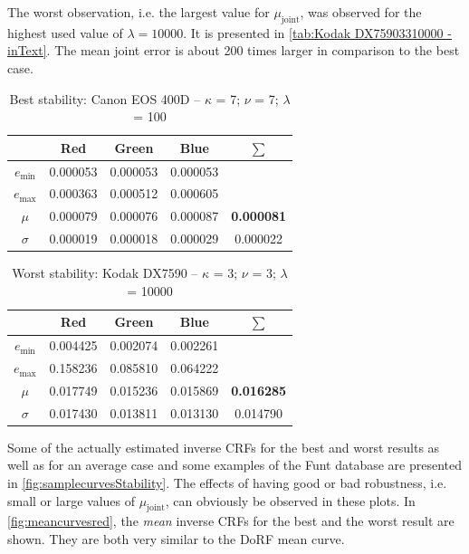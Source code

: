 The worst observation, \hbox{i.e.} the largest value for $\mu_\text{joint}$, was observed for the highest used value of $\lambda = 10000$. It is presented in \autoref{tab:Kodak DX75903310000 - inText}. The mean joint error is about 200 times larger in comparison to the best case.
\begin{table}[tb]
  \centering
    \begin{tabular}{|c||c|c|c|c|}\hline
		   & \textbf{Red} & \textbf{Green} & \textbf{Blue} & \textbf{$\sum$} \\\hline\hline
      $e_\text{min}$ & 0.000053 & 0.000053 & 0.000053 &   \\\hline
      $e_\text{max}$ & 0.000363 & 0.000512 & 0.000605 &   \\\hline
      $\mu$          & 0.000079 & 0.000076 & 0.000087 & \textbf{0.000081} \\\hline
      $\sigma$       & 0.000019 & 0.000018 & 0.000029 & 0.000022 \\\hline
    \end{tabular}
  \caption{Best stability: Canon EOS 400D -- $\kappa$ = 7; $\nu$ = 7; $\lambda$ = 100}
  \label{tab:Canon EOS 400D Rebel XTi77100 - inText}
\end{table}
\begin{table}
  \centering
    \begin{tabular}{|c||c|c|c|c|}\hline
		   & \textbf{Red} & \textbf{Green} & \textbf{Blue} & \textbf{$\sum$} \\\hline\hline
      $e_\text{min}$ & 0.004425 & 0.002074 & 0.002261 &   \\\hline
      $e_\text{max}$ & 0.158236 & 0.085810 & 0.064222 &   \\\hline
      $\mu$          & 0.017749 & 0.015236 & 0.015869 & \textbf{0.016285} \\\hline
      $\sigma$       & 0.017430 & 0.013811 & 0.013130 & 0.014790 \\\hline
    \end{tabular}
  \caption{Worst stability: Kodak DX7590 -- $\kappa$ = 3; $\nu$ = 3; $\lambda$ = 10000}
  \label{tab:Kodak DX75903310000 - inText}
\end{table}

Some of the actually estimated inverse CRFs for the best and worst results as well as for an average case and some examples of the Funt database are presented in \autoref{fig:samplecurvesStability}. The effects of having good or bad robustness, \hbox{i.e.} small or large values of $\mu_\text{joint}$, can obviously be observed in these plots. In \autoref{fig:meancurvesred}, the \emph{mean} inverse CRFs for the best and the worst result are shown. They are both very similar to the DoRF mean curve.

